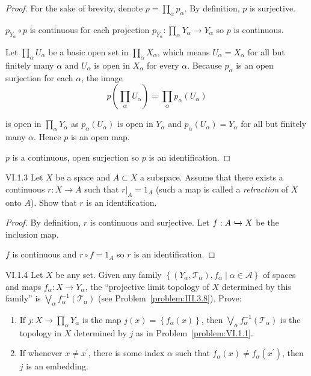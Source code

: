 \begin{proof}
	For the sake of brevity, denote \( p = \prod_{\alpha} p_{\alpha} \). By definition, \( p \) is surjective.

	\( p_{Y_{\alpha}} \circ p \) is continuous for each projection \( p_{Y_{\alpha}}: \prod_{\alpha} Y_{\alpha} \to Y_{\alpha} \) so \( p \) is continuous.

	Let \( \prod_{\alpha} U_{\alpha} \) be a basic open set in \( \prod_{\alpha} X_{\alpha} \), which means \( U_{\alpha} = X_{\alpha} \) for all but finitely many \( \alpha \) and \( U_{\alpha} \) is open in \( X_{\alpha} \) for every \( \alpha \). Because \( p_{\alpha} \) is an open surjection for each \( \alpha \), the image
	\[
		p\left( \prod_{\alpha} U_{\alpha} \right) = \prod_{\alpha} p_{\alpha}(U_{\alpha})
	\]

	is open in \( \prod_{\alpha} Y_{\alpha} \) as \( p_{\alpha}(U_{\alpha}) \) is open in \( Y_{\alpha} \) and \( p_{\alpha}(U_{\alpha}) = Y_{\alpha} \) for all but finitely many \( \alpha \). Hence \( p \) is an open map.

	\( p \) is a continuous, open surjection so \( p \) is an identification.
\end{proof}

\begin{problem}{VI.1.3}
Let \( X \) be a space and \( A \subset X \) a subspace. Assume that there exists a continuous \( r: X \to A \) such that \( r\vert_{A} = 1_{A} \) (such a map is called a \textit{retraction} of \(X\) onto \(A\)). Show that \( r \) is an identification.
\end{problem}

\begin{proof}
	By definition, \( r \) is continuous and surjective. Let \( f: A \xhookrightarrow{} X \) be the inclusion map.

	\( f \) is continuous and \( r \circ f = 1_{A} \) so \( r \) is an identification.
\end{proof}

\begin{problem}{VI.1.4}\label{problem:VI.1.4}
Let \( X \) be any set. Given any family \( \left\{ (Y_{\alpha}, \mathscr{T}_{\alpha}), f_{\alpha} \mid \alpha \in \mathscr{A} \right\} \) of spaces and maps \( f_{\alpha}: X \to Y_{\alpha} \), the ``projective limit topology of \(X\) determined by this family'' is \( \bigvee_{\alpha} f_{\alpha}^{-1}(\mathscr{T}_{\alpha}) \) (see Problem~\ref{problem:III.3.8}). Prove:
\begin{enumerate}[label={(\alph*)}]
	\item If \( j: X \to \prod_{\alpha} Y_{\alpha} \) is the map \( j(x) = \left\{ f_{\alpha}(x) \right\} \), then \( \bigvee_{\alpha} f_{\alpha}^{-1}(\mathscr{T}_{\alpha}) \) is the topology in \(X\) determined by \(j\) as in Problem~\ref{problem:VI.1.1}.
	\item If whenever \( x \ne x^{\prime} \), there is some index \( \alpha \) such that \( f_{\alpha}(x) \ne f_{\alpha}(x^{\prime}) \), then \( j \) is an embedding.
\end{enumerate}
\end{problem}

